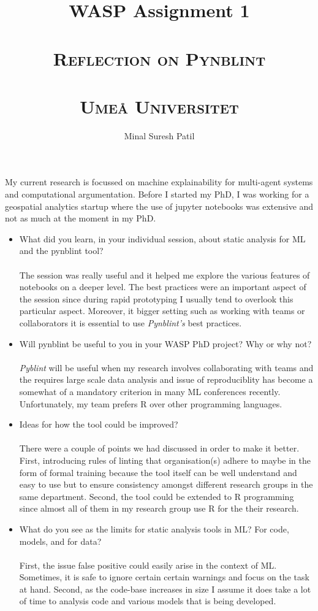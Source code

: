 \documentclass[11pt,a4paper]{article}
\title{%
  WASP Assignment 1 \\~\\
  \textsc{Reflection on Pynblint}\\~\\
  \small\textsc{Umeå Universitet}}
\author{Minal Suresh Patil}
\date{}
\begin{document}
\maketitle

My current research is focussed on machine explainability for multi-agent systems and computational argumentation. Before I started my PhD, I was working for a geospatial analytics startup where the use of \textsf{jupyter notebooks} was extensive and not as much at the moment in my PhD. 


\begin{itemize}
    \item What did you learn, in your individual session, about static analysis for ML and the pynblint tool? \\~\\
    The session was really useful and it helped me explore the various features of \textsf{notebooks} on a deeper level. The best practices were an important aspect of the session since during rapid prototyping I usually tend to overlook this particular aspect. Moreover, it bigger setting such as working with teams or collaborators it is essential to use \textit{Pynblint's} best practices. 
    \item Will pynblint be useful to you in your WASP PhD project? Why or why not? \\~\\
    \textit{Pyblint} will be useful when my research involves collaborating with teams and the requires large scale data analysis and issue of reproduciblity has become a somewhat of a mandatory criterion in many ML conferences recently. Unfortunately, my team prefers \textsf{R} over other programming languages.
    \item Ideas for how the tool could be improved? \\~\\
    There were a couple of points we had discussed in order to make it better. First, introducing rules of linting that organisation(s) adhere to maybe in the form of formal training because the tool itself can be well understand and easy to use but to ensure consistency amongst different research groups in the same department. Second, the tool could be extended to R programming since almost all of them in my research group use R for the their research. 
    \item What do you see as the limits for static analysis tools in ML? For code, models, and for data? \\~\\
    First, the issue false positive could easily arise in the context of ML. Sometimes, it is safe to ignore certain certain warnings and focus on the task at hand. Second, as the code-base increases in size I assume it does take a lot of time to analysis code and various models that is being developed.
\end{itemize}

%
%
\end{document}
